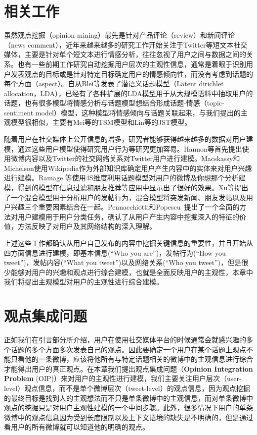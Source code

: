 \section{相关工作}
\label{ch5_sec2}
虽然观点挖掘（opinion mining）最先是针对产品评论（review）和新闻评论（news comment），近年来越来越多的研究工作开始关注于Twitter等短文本社交媒体，主要是针对单个短文本进行情感分析，往往忽视了用户之间与数据之间的关系。也有一些前期工作研究自动挖掘用户层次的主观性信息，通常是着眼于识别用户发表观点的目标或是针对特定目标确定用户的情感倾向性，而没有考虑到话题的每个方面（aspect）。自从Blei等发表了潜语义话题模型（Latent dirichlet allocation，LDA），已经有了各种扩展的LDA模型用于从大规模语料中抽取用户的话题，也有很多模型将情感分析与话题模型想结合形成话题-情感（topic-sentiment model）模型，这种模型将情感倾向与话题关联起来，与我们提出的主观模型很相似，主要有Mei等的TSM模型和Lin等的JST模型。

随着用户在社交媒体上公开信息的增多，研究者能够获得越来越多的数据对用户建模，通过这些用户模型使得研究用户行为等研究更加容易。Hannon等首先提出使用微博内容以及Twitter的社交网络关系对Twitter用户进行建模。Macskassy和Michelson使用Wikipedia作为外部知识库确定用户产生内容中的实体来对用户兴趣进行建模。Ramage 等使用4S维度利用话题模型对用户的微博及你想那个分析建模，得到的模型在信息过滤和朋友推荐等应用中显示出了很好的效果。Xu等提出了一个混合模型用于分析用户的发帖行为，混合模型将突发新闻、朋友发帖以及用户兴趣三个重要因素结合在一起。Pennacchiotti和Popescu~提出了一个全面的方法对用户建模用于用户分类任务，确认了从用户产生内容中挖掘深入的特征的价值，方法反映了对用户及其网络结构的深入理解。

上述这些工作都确认从用户自己发布的内容中挖掘关键信息的重要性，并且开始从四方面信息进行建模，即基本信息(“Who you are”)，发帖行为(“How
you tweet”)，发帖内容(“What you tweet”)以及网络关系(“Who you tweet”)，但是很少能够对用户的兴趣和观点进行综合建模，也就是全面反映用户的主观性，本章中我们将提出主观模型对用户的主观性进行综合建模。

\section{观点集成问题}
\label{sec3}
正如我们在引言部分所介绍，用户在使用社交媒体平台的时候通常会就感兴趣的多个话题的多个方面多次发表自己的观点。因此要确定一个用户在某个话题上观点不能只看他的一条微博，应该将他所有与特定话题相关的微博中的主观信息进行综合才能得出用户的真正观点。在本章我们提出观点集成问题（\textbf{Opinion Integration Problem} (OIP)）来对用户的主观性进行建模，我们主要关注用户层次（user-level）观点信息，而不是单个微博层次（tweet-level）的观点信息，因为观点挖掘的最终目标是找到人的主观想法而不只是单条微博中的主观信息，而对单条微博中观点的挖掘只是对用户主观性建模的一个中间步骤。此外，很多情况下用户的单条微博中的观点信息因为受到长度限制以及上下文语境的缺失是不明确的，但是通过看用户的所有微博就可以知道他的明确的观点。

